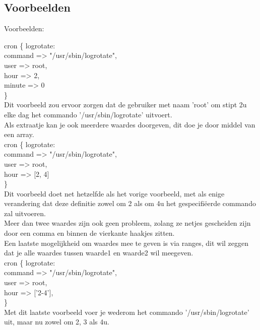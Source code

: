 \subsection{Voorbeelden}
Voorbeelden:

	cron \{ logrotate:\\
		command => "/usr/sbin/logrotate",\\
		user => root,\\
		hour => 2,\\
		minute => 0\\
	\}\\

	Dit voorbeeld zou ervoor zorgen dat de gebruiker met naam 'root' om stipt 2u elke dag het commando '/usr/sbin/logrotate' uitvoert.\\
	Als extraatje kan je ook meerdere waardes doorgeven, dit doe je door middel van een array.\\

	cron \{ logrotate:\\
		command => "/usr/sbin/logrotate",\\
		user => root,\\
		hour => [2, 4]\\
	\}\\

	Dit voorbeeld doet net hetzelfde als het vorige voorbeeld, met als enige verandering dat deze definitie zowel om 2 als om 4u het gespecifi\"{e}erde commando zal uitvoeren.\\
	Meer dan twee waardes zijn ook geen probleem, zolang ze netjes gescheiden zijn door een comma en binnen de vierkante haakjes zitten.\\

	Een laatste mogelijkheid om waardes mee te geven is via ranges, dit wil zeggen dat je alle waardes tussen waarde1 en waarde2 wil meegeven.\\

	cron \{ logrotate:\\
		command => "/usr/sbin/logrotate",\\
		user => root,\\
		hour => ['2-4'],\\
	\}\\

	Met dit laatste voorbeeld voer je wederom het commando '/usr/sbin/logrotate' uit, maar nu zowel om 2, 3 als 4u.\\

